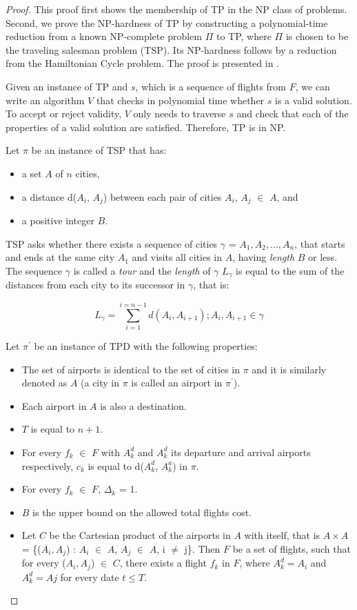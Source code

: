 \documentclass{article}
\theoremstyle{definition}
\begin{document}
\begin{proof}
This proof first shows the membership of TP in the NP class of problems. Second, we prove the NP-hardness of TP by constructing a polynomial-time reduction from a known NP-complete problem $\Pi$ to TP, where $\Pi$ is chosen to be the traveling salesman problem (TSP). Its NP-hardness follows by a reduction from the Hamiltonian Cycle problem. The proof is presented in \cite{thebible}.

Given an instance of TP and $s$, which is a sequence of flights from $F$, we can write an algorithm $V$ that checks in polynomial time whether $s$ is a valid solution. To accept or reject validity, $V$ only needs to traverse $s$ and check that each of the properties of a valid solution are satisfied. Therefore, TP is in NP.

Let $\pi$ be an instance of TSP that has:
\begin{itemize}
\item a set $A$ of $n$ cities,
\item a distance d($A_{i}$, $A_{j}$) between each pair of cities $A_{i}$, $A_{j}$ $\in$ $A$, and
\item a positive integer $B$.
\end{itemize}
TSP asks whether there exists a sequence of cities $\gamma$ = $A_{1}, A_{2},...,A_{n}$, that starts and ends at the same city $A_{1}$ and visits all cities in $A$, having \textit{length} $B$ or less. The sequence $\gamma$ is called a \textit{tour} and the \textit{length} of $\gamma$ $L_{\gamma}$ is equal to the sum of the distances from each city to its successor in $\gamma$, that is:

$$L_{\gamma} = \sum_{i=1}^{i=n-1} d(A_{i}, A_{i+1}); A_{i}, A_{i+1} \in \gamma$$

Let $\pi^{\prime}$ be an instance of TPD with the following properties:
\begin{itemize}
\item The set of airports is identical to the set of cities in $\pi$ and it is similarly denoted as $A$ (a city in $\pi$ is called an airport in $\pi^{\prime}$).
\item Each airport in $A$ is also a destination.
\item $T$ is equal to $n+1$. 
\item For every $f_{k}$ $\in$ $F$ with $A^{d}_{k}$ and $A^{d}_{k}$ its departure and arrival airports respectively, $c_{k}$ is equal to d($A^{d}_{k}$, $A^{a}_{k}$) in $\pi$. 
\item For every $f_{k}$ $\in$ $F$, $\Delta_{k}$ = 1.
\item $B$ is the upper bound on the allowed total flights cost.
\item Let $C$ be the Cartesian product of the airports in $A$ with itself, that is $A \times A$ = \{($A_{i}, A_{j}$) : $A_{i}$ $\in$ $A$, $A_{j}$ $\in$ $A$, i $\neq$ j\}. Then $F$ be a set of flights, such that for every ($A_{i}, A_{j}$) $\in$ $C$, there exists a flight $f_{k}$ in $F$, where $A^{d}_{k} = A_{i}$ and $A^{d}_{k} = A{j}$ for every date $t \leq T$.
\end{itemize}


\end{proof}
\end{document}
